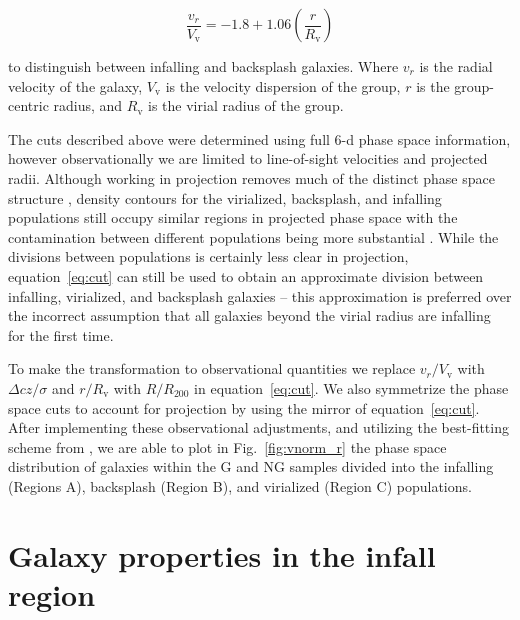 \documentclass[a4paper,fleqn,usenatbib]{mnras}
\begin{document}
\begin{equation} \label{eq:cut}
  \frac{v_r}{V_\mathrm{v}} = -1.8 + 1.06
  \left(\frac{r}{R_\mathrm{v}}\right)
\end{equation}

\noindent
to distinguish between infalling and backsplash galaxies.  Where $v_r$
is the radial velocity of the galaxy, $V_\mathrm{v}$ is the velocity
dispersion of the group, $r$ is the group-centric radius, and
$R_\mathrm{v}$ is the virial radius of the group.
\par
The cuts described above were determined using full 6-d phase space
information, however observationally we are limited to line-of-sight
velocities and projected radii.  Although working in projection
removes much of the distinct phase space structure \citep{oman2013},
density contours for the virialized, backsplash, and infalling
populations still occupy similar regions in projected phase space
with the contamination between different populations being more substantial
\citep{mahajan2011}.  While the divisions between populations is
certainly less clear in projection, equation~\ref{eq:cut} can still be
used to obtain an approximate division between infalling, virialized,
and backsplash galaxies -- this approximation is preferred over
the incorrect assumption that all galaxies beyond the virial radius
are infalling for the first time.
\par
To make the transformation to observational quantities we replace
$v_r/V_\mathrm{v}$ with $\Delta cz/\sigma$ and $r/R_\mathrm{v}$ with
$R/R_{200}$ in equation~\ref{eq:cut}.  We also symmetrize the phase
space cuts to account for projection by using the mirror of
equation~\ref{eq:cut}.  After implementing these observational
adjustments, and utilizing the best-fitting scheme from
\citet{mahajan2011}, we are able to plot in Fig.~\ref{fig:vnorm_r} the
phase space distribution of galaxies within the G and NG samples
divided into the infalling (Regions A), backsplash (Region B), and
virialized (Region C) populations. 


\section{Galaxy properties in the infall region}
\label{sec:infall}
\end{document}
